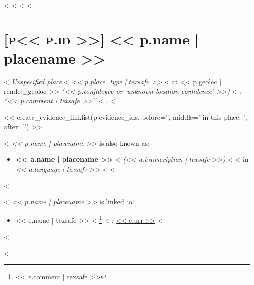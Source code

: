 <%
<%
<%
<%
\section*{\hypertarget{place<<p.id>>}{\textsc{[p<< p.id >>]} << p.name | placename >>}}

<%
  \emph{Unspecified place}
<%
  \emph{<< p.place_type | texsafe >>}
<%
at
<< p.geoloc | render_geoloc >>
\emph{(<< p.confidence or 'unknown location confidence' >>)}
<%
: \emph{\enquote{<< p.comment | texsafe >>}}
<%
.
<%


<< create_evidence_linklist(p.evidence_ids, before='', middle=' in this place: ', after='') >>

<%
  \emph{<< p.name | placename >>} is also known as:

  \begin{itemize}
    <%
    \item
      \textbf{<< a.name | placename >>}
      <%
      \emph{(<< a.transcription | texsafe >>)}
      <%
      <%
      in
      \emph{<< a.language | texsafe >>}
      <%
    <%
  \end{itemize}
<%

<%
  \emph{<< p.name | placename >>} is linked to:

  \begin{itemize}
    <%
    \item
      << e.name | texsafe >>
      <%
      \footnote{<< e.comment | texsafe >>}
      <%
      : \url{<< e.uri >>}
    <%
  \end{itemize}
<%

<%
